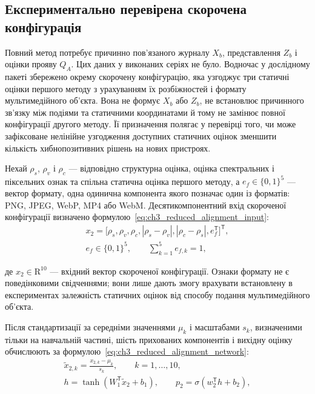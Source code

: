 \subsection{Експериментально перевірена скорочена конфігурація}

Повний метод потребує причинно пов’язаного журналу $X_b$, представлення $Z_b$ і оцінки прояву $Q_A$. Цих даних у виконаних серіях не було. Водночас у дослідному пакеті збережено окрему скорочену конфігурацію, яка узгоджує три статичні оцінки першого методу з урахуванням їх розбіжностей і формату мультимедійного об’єкта. Вона не формує $X_b$ або $Z_b$, не встановлює причинного зв’язку між подіями та статичними координатами й тому не замінює повної конфігурації другого методу. Її призначення полягає у перевірці того, чи може зафіксоване нелінійне узгодження доступних статичних оцінок зменшити кількість хибнопозитивних рішень на нових пристроях.

Нехай $\rho_s$, $\rho_v$ і $\rho_c$ --- відповідно структурна оцінка, оцінка спектральних і піксельних ознак та спільна статична оцінка першого методу, а $e_f\in\{0,1\}^{5}$ --- вектор формату, одна одинична компонента якого позначає один із форматів: PNG, JPEG, WebP, MP4 або WebM. Десятикомпонентний вхід скороченої конфігурації визначено формулою~\eqref{eq:ch3_reduced_alignment_input}:
\begin{equation}
\begin{gathered}
x_2=\bigl[\rho_s,\rho_v,\rho_c,|\rho_s-\rho_v|,|\rho_c-\rho_s|,e_f^{\mathsf T}\bigr]^{\mathsf T},\\
e_f\in\{0,1\}^{5},\qquad \sum_{k=1}^{5}e_{f,k}=1,
\end{gathered}
\label{eq:ch3_reduced_alignment_input}
\end{equation}

де $x_2\in\mathrm R^{10}$ --- вхідний вектор скороченої конфігурації. Ознаки формату не є поведінковими свідченнями; вони лише дають змогу врахувати встановлену в експериментах залежність статичних оцінок від способу подання мультимедійного об’єкта.

Після стандартизації за середніми значеннями $\mu_k$ і масштабами $s_k$, визначеними тільки на навчальній частині, шість прихованих компонентів і вихідну оцінку обчислюють за формулою~\eqref{eq:ch3_reduced_alignment_network}:
\begin{equation}
\begin{gathered}
\widetilde{x}_{2,k}=\frac{x_{2,k}-\mu_k}{s_k},\qquad k=1,\ldots,10,\\
h=\tanh\!\left(W_1^{\mathsf T}\widetilde{x}_2+b_1\right),\qquad
p_2=\sigma\!\left(w_2^{\mathsf T}h+b_2\right),
\end{gathered}
\label{eq:ch3_reduced_alignment_network}
\end{equation}

